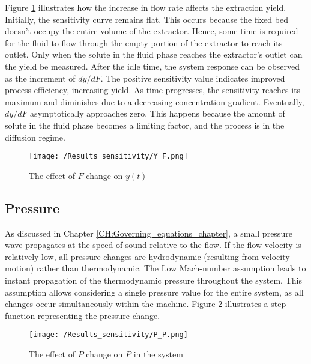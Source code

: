 \documentclass[../Article_Sensitivity_Analsysis.tex]{subfiles}
\begin{document}
    Figure \ref{fig:Sensitivty_F_y} illustrates how the increase in flow rate affects the extraction yield. Initially, the sensitivity curve remains flat. This occurs because the fixed bed doesn't occupy the entire volume of the extractor. Hence, some time is required for the fluid to flow through the empty portion of the extractor to reach its outlet. Only when the solute in the fluid phase reaches the extractor's outlet can the yield be measured. After the idle time, the system response can be observed as the increment of  $dy/dF$. The positive sensitivity value indicates improved process efficiency, increasing yield. As time progresses, the sensitivity reaches its maximum and diminishes due to a decreasing concentration gradient. Eventually, $dy/dF$ asymptotically approaches zero. This happens because the amount of solute in the fluid phase becomes a limiting factor, and the process is in the diffusion regime.
    
    \begin{figure}[h!]
    	\centering
    	\texttt{[image: /Results\_sensitivity/Y\_F.png]}
    	\caption{The effect of $F$ change on $y(t)$}
    	\label{fig:Sensitivty_F_y}
    \end{figure}
    
    \subsection{Pressure}
    
    As discussed in Chapter \ref{CH:Governing_equations_chapter}, a small pressure wave propagates at the speed of sound relative to the flow. If the flow velocity is relatively low, all pressure changes are hydrodynamic (resulting from velocity motion) rather than thermodynamic. The Low Mach-number assumption leads to instant propagation of the thermodynamic pressure throughout the system. This assumption allows considering a single pressure value for the entire system, as all changes occur simultaneously within the machine. Figure \ref{fig:Sensitivty_P_P} illustrates a step function representing the pressure change.
    
    \begin{figure}[h!]
    	\centering
    	\texttt{[image: /Results\_sensitivity/P\_P.png]}
    	\caption{The effect of $P$ change on $P$ in the system}
    	\label{fig:Sensitivty_P_P}
    \end{figure}
    
\end{document}
